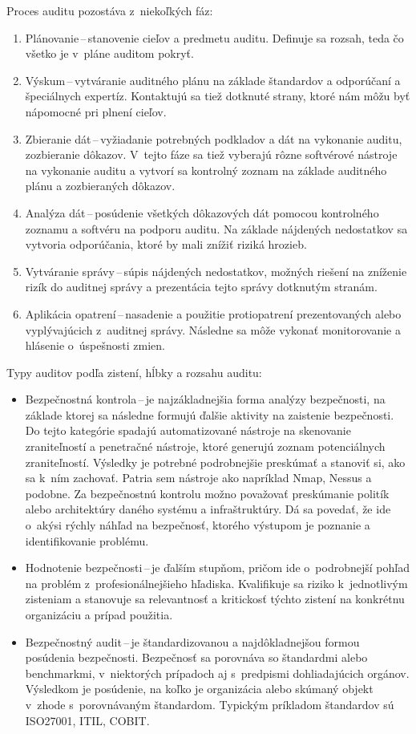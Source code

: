\vspace{1em}
\noindent
Proces auditu pozostáva z~niekoľkých fáz: \cite{Jackson2010} 
\begin{enumerate}
	\item Plánovanie\,--\,stanovenie cieľov a predmetu auditu. Definuje sa rozsah, teda čo všetko je v~pláne auditom pokryť. 
	\item Výskum\,--\,vytváranie auditného plánu na základe štandardov a odporúčaní a špeciálnych expertíz. Kontaktujú sa tiež dotknuté strany, ktoré nám môžu byť nápomocné pri plnení cieľov.
	\item Zbieranie dát\,--\,vyžiadanie potrebných podkladov a dát na vykonanie auditu, zozbieranie dôkazov. V~tejto fáze sa tiež vyberajú rôzne softvérové nástroje na vykonanie auditu a vytvorí sa kontrolný zoznam na základe auditného plánu a zozbieraných dôkazov.  
	\item Analýza dát\,--\,posúdenie všetkých dôkazových dát pomocou kontrolného zoznamu a softvéru na podporu auditu. Na základe nájdených nedostatkov sa vytvoria odporúčania, ktoré by mali znížiť riziká hrozieb.
	\item Vytváranie správy\,--\,súpis nájdených nedostatkov, možných riešení na zníženie rizík do auditnej správy a prezentácia tejto správy dotknutým stranám.
	\item Aplikácia opatrení\,--\,nasadenie a použitie protiopatrení prezentovaných alebo vyplývajúcich z~auditnej správy. Následne sa môže vykonať monitorovanie a hlásenie o~úspešnosti zmien.
\end{enumerate}

\vspace{1em}
\noindent
Typy auditov podľa zistení, hĺbky a rozsahu auditu:
\begin{itemize}
	\item Bezpečnostná kontrola\,--\,je najzákladnejšia forma analýzy bezpečnosti, na základe ktorej sa následne formujú ďalšie aktivity na zaistenie bezpečnosti. Do tejto kategórie spadajú automatizované nástroje na skenovanie zraniteľností a penetračné nástroje, ktoré generujú zoznam potenciálnych zraniteľností. Výsledky je potrebné podrobnejšie preskúmať a stanoviť si, ako sa k~ním zachovať. Patria sem nástroje ako napríklad Nmap, Nessus a podobne. Za bezpečnostnú kontrolu možno považovať preskúmanie politík alebo architektúry daného systému a infraštruktúry. Dá sa povedať, že ide o~akýsi rýchly náhľad na bezpečnosť, ktorého výstupom je poznanie a identifikovanie problému.
	\item Hodnotenie bezpečnosti\,--\,je ďalším stupňom, pričom ide o~podrobnejší pohľad na problém z~profesionálnejšieho hľadiska. Kvalifikuje sa riziko k~jednotlivým zisteniam a stanovuje sa relevantnosť a kritickosť týchto zistení na konkrétnu organizáciu a prípad použitia.
	\item Bezpečnostný audit\,--\,je štandardizovanou a najdôkladnejšou formou posúdenia bezpečnosti. Bezpečnosť sa porovnáva so štandardmi alebo benchmarkmi, v~niektorých prípadoch aj s~predpismi dohliadajúcich orgánov. Výsledkom je posúdenie, na koľko je organizácia alebo skúmaný objekt v~zhode s~porovnávaným štandardom. Typickým príkladom štandardov sú ISO27001, ITIL, COBIT.
\end{itemize}

